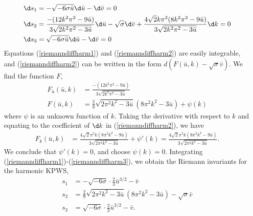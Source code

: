 \documentclass[12pt]{article}
\numberwithin{equation}{section}
\begin{document}
\begin{subequations}
\begin{align}
    \d s_{1} &= -\sqrt{-6\sigma \bar u} \d \bar u - \d \bar v = 0 \label{riemanndiffharm1} \\
    \d s_2 &= \frac{-(12k^2\pi^2-9\bar u)}{3\sqrt{2k^2\pi^2-3\bar u}}\d \bar u -\sqrt{\sigma}\d \bar v + \frac{4\sqrt{2}k\pi^2(8k^2\pi^2-9\bar u)}{3\sqrt{2k^2\pi^2-3\bar u}} \d k = 0 \label{riemanndiffharm2} \\
     \d s_{3} &= \sqrt{-6\sigma \bar u} \d \bar u - \d \bar v = 0 \label{riemanndiffharm3} 
\end{align}
\end{subequations}
Equations (\ref{riemanndiffharm1}) and (\ref{riemanndiffharm2}) are easily integrable, and (\ref{riemanndiffharm2}) can be written in the form $d\left(F(\bar u,k) - \sqrt{\sigma}\bar v \right)$. We find the function $F$,
\begin{align}
    F_{\bar u }(\bar u, k) &= \frac{-(12k^2\pi^2-9\bar u)}{3\sqrt{2k^2\pi^2-3\bar u}} \\
    F(\bar u, k) &= \frac{2}{9} \sqrt{2 \pi ^2 k^2-3 \bar u} \left(8 \pi ^2 k^2-3 \bar u\right) + \psi(k)
\end{align}
where $\psi$ is an unknown function of $k$. Taking the derivative with respect to $k$ and equating to the coefficient of $\d k$ in (\ref{riemanndiffharm2}), we have 
\begin{align}
    F_k(\bar u, k) &= \frac{4 \sqrt{2} \pi ^2 k \left(8 \pi ^2 k^2-9 \bar u\right)}{3 \sqrt{2 \pi ^2 k^2-3 \bar u}} + \psi'(k) = \frac{4 \sqrt{2} \pi ^2 k \left(8 \pi ^2 k^2-9 \bar u\right)}{3 \sqrt{2 \pi ^2 k^2-3 \bar u}}.
\end{align}
We conclude that $\psi'(k)=0$, and choose $\psi(k)=0$. Integrating (\ref{riemanndiffharm1})-(\ref{riemanndiffharm3}), we obtain the Riemann invariants for the harmonic KPWS,
\begin{subequations}
\begin{align}
    s_{1} &= -\sqrt{-6\sigma}\cdot \frac{2}{3}\bar u^{3/2} - \bar v \\
    s_2 &= \frac{2}{9} \sqrt{2 \pi ^2 k^2-3 \bar u} \left(8 \pi ^2 k^2-3 \bar u\right) - \sqrt{\sigma}\bar v \\
     s_{3} &= \sqrt{-6\sigma}\cdot \frac{2}{3}\bar u^{3/2} - \bar v.
\end{align}
\end{subequations}
\end{document}
